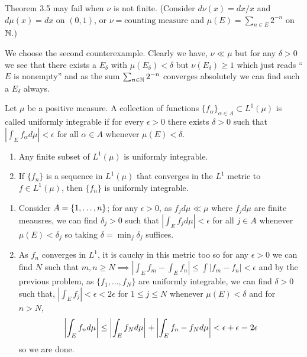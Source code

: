\documentclass[12pt,a4paper]{article}
\begin{document}
\begin{problem}\label{prob:3-10}
Theorem 3.5 may fail when $\nu$ is not finite. (Consider $d\nu(x)=dx/x$ and $d\mu(x)=dx$ on $(0, 1)$, or $\nu = \text{counting measure}$ and $\mu(E)=\sum_{n\in E}2^{-n}$ on $\mathbb{N}$.)
\end{problem}
\begin{solution}
We choose the second counterexample. 
Clearly we have, $\nu\ll\mu$ but for any $\delta>0$ we see that there exists a $E_\delta$ with $\mu(E_\delta)<\delta$ but $\nu(E_\delta)\geq 1$ which just reads ``$E$ is nonempty'' and as the sum $\sum_{n\in\mathbb{N}}2^{-n}$ converges absolutely we can find such a $E_\delta$ always.
\end{solution}
\begin{problem}\label{prob:3-11}
Let $\mu$ be a positive measure. A collection of functions $\{f_{\alpha}\}_{\alpha\in A}\subset L^{1}(\mu)$ is called uniformly integrable if for every $\epsilon>0$ there exists $\delta>0$ such that $|\int_{E}f_{\alpha}d\mu|<\epsilon$ for all $\alpha\in A$ whenever $\mu(E)<\delta$.
\begin{enumerate}[label=\alph*.]
    \item Any finite subset of $L^{1}(\mu)$ is uniformly integrable.
    \item If $\{f_{n}\}$ is a sequence in $L^{1}(\mu)$ that converges in the $L^{1}$ metric to $f\in L^{1}(\mu)$, then $\{f_{n}\}$ is uniformly integrable.
\end{enumerate}
\end{problem}
\begin{solution}
\begin{enumerate}[label=\alph*.]
	\item Consider $A=\qty{1,\ldots,n}$; for any $\epsilon>0$, as $f_jd\mu\ll\mu$ where $f_jd\mu$ are finite meausres, we can find $\delta_j>0$ such that $|\int_{E}f_jd\mu|<\epsilon$ for all $j\in A$ whenever $\mu(E)<\delta_j$ so taking $\delta=\min_j\delta_j$ suffices.
	\item As $f_n$ converges in $L^1$, it is cauchy in this metric too so for any $\epsilon>0$ we can find $N$ such that $m,n\geq N\implies|\int_Ef_m-\int_Ef_n|\leq\int|f_m-f_n|<\epsilon$ and by the previous problem, as $\{f_1,\ldots,f_N\}$ are uniformly integrable, we can find $\delta>0$ such that, $|\int_E f_j|<\epsilon<2\epsilon$ for $1\leq j\leq N$ whenever $\mu(E)<\delta$ and for $n>N,$
		\[
		    \qty|\int_Ef_nd\mu|\leq\qty|\int_Ef_Nd\mu|+\qty|\int_Ef_n-f_Nd\mu|<\epsilon+\epsilon=2\epsilon
		\]
	so we are done.
\end{enumerate}
\end{solution}
\end{document}
